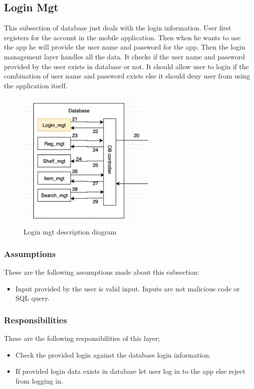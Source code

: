\subsection{Login Mgt}
This subsection of database just deals with the login information. User first registers for the account in the mobile application. Then when he wants to use the app he will provide the user name and password for the app. Then the login management layer handles all the data. It checks if the user name and password provided by the user exists in database or not. It should allow user to login if the combination of user name and password exists else it should deny user from using the application itself.

\begin{figure}[h!]
	\centering
 	\includegraphics[width=0.60\textwidth]{images/loginmgt}
 \caption{Login mgt description diagram}
\end{figure}

\subsubsection{Assumptions}
These are the following assumptions made about this subsection:
\begin{itemize}
    \item Input provided by the user is valid input. Inputs are not malicious code or SQL query.
\end{itemize}

\subsubsection{Responsibilities}
These are the following responsibilities of this layer;
\begin{itemize}
    \item Check the provided login against the database login information.
    \item If provided login data exists in database let user log in to the app else reject from logging in.
\end{itemize}

